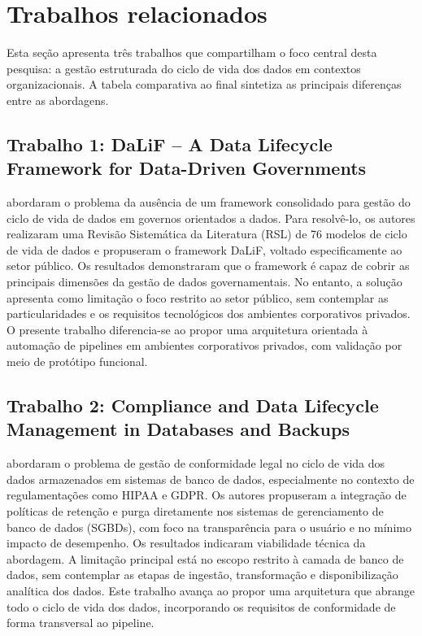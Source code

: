 \documentclass[
    12pt,                %
    openright,           %
    oneside,             %
    a4paper,             %
    english,             %
    brazil               %
]{abntex2}
\begin{document}
\section{Trabalhos relacionados}
\label{sec:trabalhos_relacionados}

Esta seção apresenta três trabalhos que compartilham o foco central desta pesquisa: a gestão estruturada do ciclo de vida dos dados em contextos organizacionais. A tabela comparativa ao final sintetiza as principais diferenças entre as abordagens.

\subsection{Trabalho 1: DaLiF -- A Data Lifecycle Framework for Data-Driven Governments}

 abordaram o problema da ausência de um framework consolidado para gestão do ciclo de vida de dados em governos orientados a dados. Para resolvê-lo, os autores realizaram uma Revisão Sistemática da Literatura (RSL) de 76 modelos de ciclo de vida de dados e propuseram o framework DaLiF, voltado especificamente ao setor público. Os resultados demonstraram que o framework é capaz de cobrir as principais dimensões da gestão de dados governamentais. No entanto, a solução apresenta como limitação o foco restrito ao setor público, sem contemplar as particularidades e os requisitos tecnológicos dos ambientes corporativos privados. O presente trabalho diferencia-se ao propor uma arquitetura orientada à automação de pipelines em ambientes corporativos privados, com validação por meio de protótipo funcional.

\subsection{Trabalho 2: Compliance and Data Lifecycle Management in Databases and Backups}

 abordaram o problema de gestão de conformidade legal no ciclo de vida dos dados armazenados em sistemas de banco de dados, especialmente no contexto de regulamentações como HIPAA e GDPR. Os autores propuseram a integração de políticas de retenção e purga diretamente nos sistemas de gerenciamento de banco de dados (SGBDs), com foco na transparência para o usuário e no mínimo impacto de desempenho. Os resultados indicaram viabilidade técnica da abordagem. A limitação principal está no escopo restrito à camada de banco de dados, sem contemplar as etapas de ingestão, transformação e disponibilização analítica dos dados. Este trabalho avança ao propor uma arquitetura que abrange todo o ciclo de vida dos dados, incorporando os requisitos de conformidade de forma transversal ao pipeline.
\end{document}
